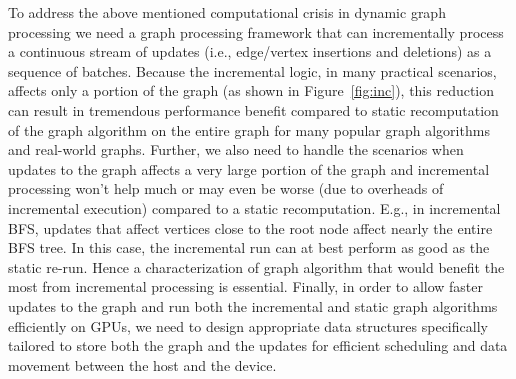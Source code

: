 To address the above mentioned computational crisis in dynamic graph processing we need a graph processing framework that can incrementally process a continuous stream of updates (i.e., edge/vertex insertions and deletions) as a sequence of batches.  Because the incremental logic, in many practical scenarios, affects only a portion of the graph (as shown in Figure~\ref{fig:inc}), this reduction can result in tremendous performance benefit compared to static recomputation of the graph algorithm on the entire graph for many popular graph algorithms and real-world graphs.
Further, we also need to handle the scenarios when updates to the graph affects a very large portion of the graph and incremental processing won’t help much or may even be worse (due to overheads of incremental execution)  compared to a static recomputation. E.g., in incremental BFS, updates that affect vertices close to the root node affect nearly the entire BFS tree. In this case, the incremental run can at best perform as good as the static re-run.  Hence a characterization of graph algorithm that would benefit the most from incremental processing is essential. Finally, in order to allow faster updates to the graph and run both the incremental and static graph algorithms efficiently on GPUs, we need to design appropriate data structures specifically tailored to store both the graph and the updates for  efficient scheduling and data movement between the host and the device. 

 